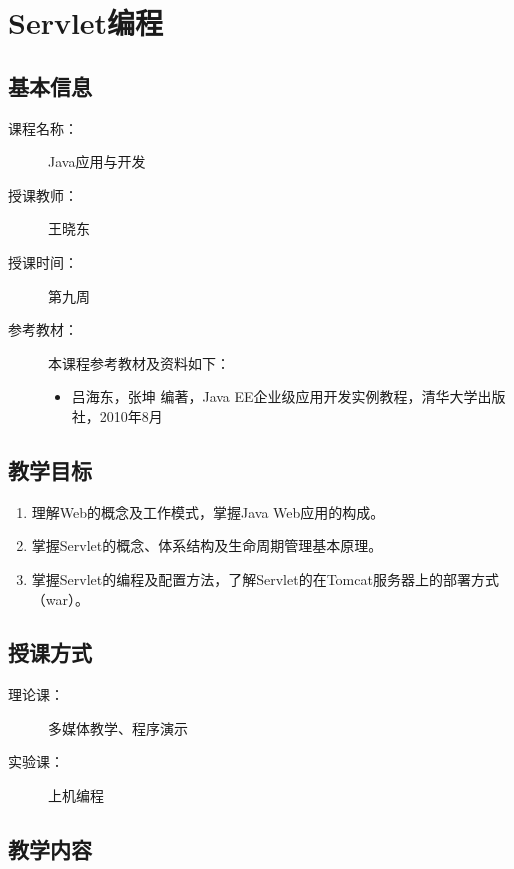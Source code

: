 \chapter{ Servlet编程}
\label{chp:JavaEE-servlet-programming}

\section*{基本信息}
\sline
\begin{description}
\item[课程名称：] Java应用与开发
\item[授课教师：] 王晓东
\item[授课时间：] 第九周
\item[参考教材：] 本课程参考教材及资料如下：
  \begin{itemize}
  \item 吕海东，张坤 编著，Java EE企业级应用开发实例教程，清华大学出版社，2010年8月
  \end{itemize}
\end{description}

\section*{教学目标}

\sline

\begin{enumerate}
\item 理解Web的概念及工作模式，掌握Java Web应用的构成。
\item 掌握Servlet的概念、体系结构及生命周期管理基本原理。
\item 掌握Servlet的编程及配置方法，了解Servlet的在Tomcat服务器上的部署方式（war）。
\end{enumerate}  

\section*{授课方式}

\sline
\begin{description}
\item[理论课：] 多媒体教学、程序演示
\item[实验课：] 上机编程
\end{description}

\newpage
\section*{教学内容}
\sline

